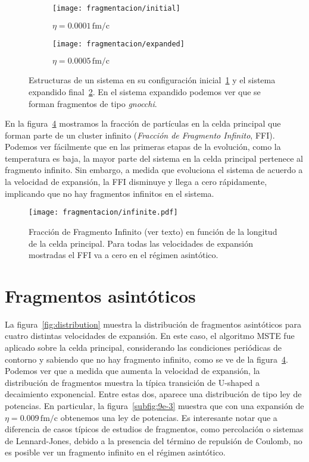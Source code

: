 \begin{figure} \centering
  \begin{subfigure}[h!]{0.45\columnwidth}
    \texttt{[image: fragmentacion/initial]}
    \caption{$\eta = 0.0001\,\text{fm/c}$}
    \label{subfig:initial}
  \end{subfigure}
  \begin{subfigure}[h!]{0.45\columnwidth}
    \texttt{[image: fragmentacion/expanded]}
    \caption{$\eta = 0.0005\,\text{fm/c}$}
    \label{subfig:expanded}
  \end{subfigure}
  \caption{Estructuras de un sistema en su configuración inicial~\ref{subfig:initial} y el sistema expandido final~\ref{subfig:expanded}.
    En el sistema expandido podemos ver que se forman fragmentos de tipo \emph{gnocchi}.}
  \label{fig:morpho}
\end{figure}

En la figura~\ref{fig:infinite} mostramos la fracción de partículas en la celda principal que forman parte de un cluster infinito (\emph{Fracción de Fragmento Infinito}, FFI).
Podemos ver fácilmente que en las primeras etapas de la evolución, como la temperatura es baja, la mayor parte del sistema en la celda principal pertenece al fragmento infinito.
Sin embargo, a medida que evoluciona el sistema de acuerdo a la velocidad de expansión, la FFI disminuye y llega a cero rápidamente, implicando que no hay fragmentos infinitos en el sistema.

\begin{figure}
  \centering
  \texttt{[image: fragmentacion/infinite.pdf]}
  \caption{Fracción de Fragmento Infinito (ver texto) en función de la longitud de la celda principal.
    Para todas las velocidades de expansión mostradas el FFI va a cero en el régimen asintótico.}
  \label{fig:infinite}
\end{figure}

\section{Fragmentos asintóticos}

La figura~\ref{fig:distribution} muestra la distribución de fragmentos asintóticos para cuatro distintas velocidades de expansión.
En este caso, el algoritmo MSTE fue aplicado sobre la celda principal, considerando las condiciones periódicas de contorno y sabiendo que no hay fragmento infinito, como se ve de la figura~\ref{fig:infinite}.
Podemos ver que a medida que aumenta la velocidad de expansión, la distribución de fragmentos muestra la típica transición de U-shaped a decaimiento exponencial.
Entre estas dos, aparece una distribución de tipo ley de potencias.
En particular, la figura~\ref{subfig:9e-3} muestra que con una expansión de $\eta = 0.009\,\text{fm/c}$ obtenemos una ley de potencias.
Es interesante notar que a diferencia de casos típicos de estudios de fragmentos, como percolación o sistemas de Lennard-Jones, debido a la presencia del término de repulsión de Coulomb, no es posible ver un fragmento infinito en el régimen asintótico.

